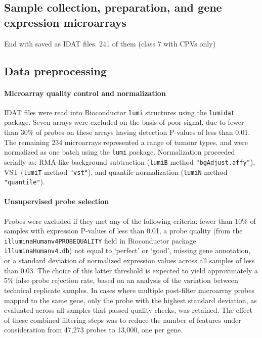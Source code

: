 \documentclass[thesis.tex]{subfiles}
\begin{document}
\subsection{Sample collection, preparation, and gene expression microarrays}
\mpfatal{}
End with saved as \gls{IDAT} files.  241 of them (class 7 with CPVs only)

\subsection{Data preprocessing}
\paragraph{Microarray quality control and normalization}
\gls{IDAT} files were read into Bioconductor \texttt{lumi} structures using the \texttt{lumidat} package.  Seven arrays were excluded on the basis of poor signal, due to fewer than 30\% of probes on these arrays having detection P-values of less than 0.01.  The remaining 234 microarrays represented a range of tumour types, and were normalized as one batch using the \texttt{lumi} package.  Normalization proceeded serially as: RMA-like background subtraction (\texttt{lumiB} method \texttt{"bgAdjust.affy"}), \gls{VST} (\texttt{lumiT} method \texttt{"vst"}), and quantile normalization (\texttt{lumiN} method \texttt{"quantile"}).

\paragraph{Unsupervised probe selection}
Probes were excluded if they met any of the following criteria: fewer than 10\% of samples with expression P-values of less than 0.01, a probe quality (from the \texttt{illuminaHumanv4PROBEQUALITY} field in Bioconductor package \texttt{illuminaHumanv4.db}) not equal to `perfect' or `good', missing gene annotation, or a standard deviation of normalized expression values across all samples of less than 0.03.  The choice of this latter threshold is expected to yield approximately a 5\% false probe rejection rate, based on an analysis of the variation between technical replicate samples.  In cases where multiple post-filter microarray probes mapped to the same gene, only the probe with the highest standard deviation, as evaluated across all samples that passed quality checks, was retained.  The effect of these combined filtering steps was to reduce the number of features under consideration from 47,273 probes to 13,000, one per gene.
\end{document}

